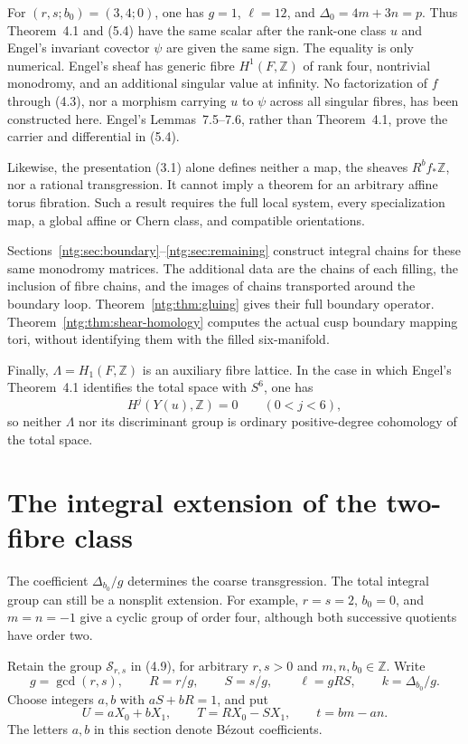\documentclass[11pt]{article}
\numberwithin{equation}{section}
\begin{document}
For $(r,s;b_0)=(3,4;0)$, one has $g=1$, $\ell=12$, and
$\Delta_0=4m+3n=p$.  Thus Theorem~4.1 and (5.4) have the same scalar after
the rank-one class $u$ and Engel's invariant covector $\psi$ are given the
same sign.  The equality is only numerical.  Engel's sheaf has generic fibre
$H^1(F,\mathbb Z)$ of rank four, nontrivial monodromy, and an additional
singular value at infinity.  No factorization of $f$ through (4.3), nor a
morphism carrying $u$ to $\psi$ across all singular fibres, has been
constructed here.  Engel's Lemmas~7.5--7.6, rather than Theorem~4.1, prove
the carrier and differential in (5.4).

Likewise, the presentation (3.1) alone defines neither a map, the sheaves
$R^bf_*\mathbb Z$, nor a rational transgression.  It cannot imply a theorem
for an arbitrary affine torus fibration.  Such a result requires the full
local system, every specialization map, a global affine or Chern class, and
compatible orientations.

Sections~\ref{ntg:sec:boundary}--\ref{ntg:sec:remaining} construct
integral chains for these same monodromy matrices. The additional data
are the chains of each filling, the inclusion of fibre chains, and the
images of chains transported around the boundary loop.
Theorem~\ref{ntg:thm:gluing} gives their full boundary operator.
Theorem~\ref{ntg:thm:shear-homology} computes the actual cusp boundary
mapping tori, without identifying them with the filled six-manifold.

Finally, $\Lambda=H_1(F,\mathbb Z)$ is an auxiliary fibre lattice.  In the
case in which Engel's Theorem~4.1 identifies the total space with $S^6$, one
has
\[
 H^j(Y(u),\mathbb Z)=0\qquad(0<j<6),
\]
so neither $\Lambda$ nor its discriminant group is ordinary positive-degree
cohomology of the total space.

\section{The integral extension of the two-fibre class}

The coefficient $\Delta_{b_0}/g$ determines the coarse transgression.
The total integral group can still be a nonsplit extension.  For example,
$r=s=2$, $b_0=0$, and $m=n=-1$ give a cyclic group of order four,
although both successive quotients have order two.

Retain the group $\mathcal S_{r,s}$ in (4.9), for arbitrary $r,s>0$ and
$m,n,b_0\in\mathbb Z$.  Write
\[
 g=\gcd(r,s),\qquad R=r/g,\qquad S=s/g,\qquad
 \ell=gRS,\qquad k=\Delta_{b_0}/g.
\]
Choose integers $a,b$ with $aS+bR=1$, and put
\begin{equation}\label{eq:seifert-split}
 U=aX_0+bX_1,\qquad T=RX_0-SX_1,\qquad t=bm-an.
\end{equation}
The letters $a,b$ in this section denote B\'ezout coefficients.
\end{document}
